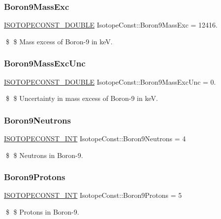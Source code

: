 \subsubsection{\texorpdfstring{Boron9\+Mass\+Exc}{Boron9MassExc}}
{\footnotesize\ttfamily \mbox{\hyperlink{group___isotope_const-_macros_ga8f45a7272ce02c0b4c65c44636ed719a}{I\+S\+O\+T\+O\+P\+E\+C\+O\+N\+S\+T\+\_\+\+D\+O\+U\+B\+LE}} Isotope\+Const\+::\+Boron9\+Mass\+Exc = 12416.}

\$ \$ Mass excess of Boron-\/9 in keV. \mbox{\label{group___isotope_const-_boron-_b9_ga43df35e232ee8040b3a59c82bbb936cf}} 
\subsubsection{\texorpdfstring{Boron9\+Mass\+Exc\+Unc}{Boron9MassExcUnc}}
{\footnotesize\ttfamily \mbox{\hyperlink{group___isotope_const-_macros_ga8f45a7272ce02c0b4c65c44636ed719a}{I\+S\+O\+T\+O\+P\+E\+C\+O\+N\+S\+T\+\_\+\+D\+O\+U\+B\+LE}} Isotope\+Const\+::\+Boron9\+Mass\+Exc\+Unc = 0.}

\$ \$ Uncertainty in mass excess of Boron-\/9 in keV. \mbox{\label{group___isotope_const-_boron-_b9_ga5e4883432f67641b49aebffd94c1c7d0}} 
\subsubsection{\texorpdfstring{Boron9\+Neutrons}{Boron9Neutrons}}
{\footnotesize\ttfamily \mbox{\hyperlink{group___isotope_const-_macros_ga5f18360b3e99483a35c32d789e62621c}{I\+S\+O\+T\+O\+P\+E\+C\+O\+N\+S\+T\+\_\+\+I\+NT}} Isotope\+Const\+::\+Boron9\+Neutrons = 4}

\$ \$ Neutrons in Boron-\/9. \mbox{\label{group___isotope_const-_boron-_b9_ga49aef02bee55980a9d0152ececc71dd0}} 
\subsubsection{\texorpdfstring{Boron9\+Protons}{Boron9Protons}}
{\footnotesize\ttfamily \mbox{\hyperlink{group___isotope_const-_macros_ga5f18360b3e99483a35c32d789e62621c}{I\+S\+O\+T\+O\+P\+E\+C\+O\+N\+S\+T\+\_\+\+I\+NT}} Isotope\+Const\+::\+Boron9\+Protons = 5}

\$ \$ Protons in Boron-\/9. 